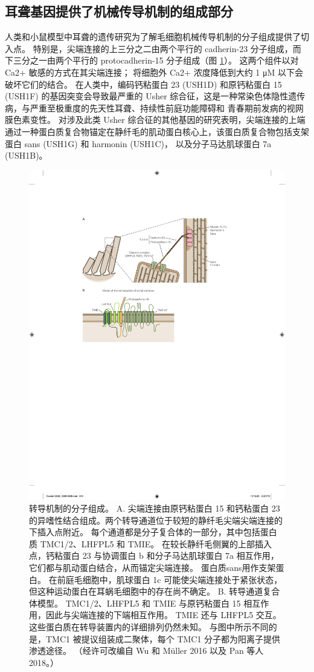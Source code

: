 \subsection{耳聋基因提供了机械传导机制的组成部分}
人类和小鼠模型中耳聋的遗传研究为了解毛细胞机械传导机制的分子组成提供了切入点。 
特别是，尖端连接的上三分之二由两个平行的 cadherin-23 分子组成，而下三分之一由两个平行的 protocadherin-15 分子组成（图 \ref{fig:26_10}）。 
这两个组件以对 Ca2+ 敏感的方式在其尖端连接； 将细胞外 Ca2+ 浓度降低到大约 1 μM 以下会破坏它们的结合。 
在人类中，编码钙粘蛋白 23 (USH1D) 和原钙粘蛋白 15 (USH1F) 的基因突变会导致最严重的 Usher 综合征，这是一种常染色体隐性遗传病，与严重至极重度的先天性耳聋、持续性前庭功能障碍和 青春期前发病的视网膜色素变性。 
对涉及此类 Usher 综合征的其他基因的研究表明，尖端连接的上端通过一种蛋白质复合物锚定在静纤毛的肌动蛋白核心上，该蛋白质复合物包括支架蛋白 sans (USH1G) 和 harmonin (USH1C)， 以及分子马达肌球蛋白 7a (USH1B)。

\begin{figure}[htbp]
	\centering
	\includegraphics[width=0.7\linewidth]{chap26/fig_26_10}
	\caption{转导机制的分子组成。 A. 尖端连接由原钙粘蛋白 15 和钙粘蛋白 23 的异嗜性结合组成。两个转导通道位于较短的静纤毛尖端尖端连接的下插入点附近。 每个通道都是分子复合体的一部分，其中包括蛋白质 TMC1/2、LHFPL5 和 TMIE。 在较长静纤毛侧翼的上部插入点，钙粘蛋白 23 与协调蛋白 b 和分子马达肌球蛋白 7a 相互作用，它们都与肌动蛋白结合，从而锚定尖端连接。 蛋白质sans用作支架蛋白。 在前庭毛细胞中，肌球蛋白 1c 可能使尖端连接处于紧张状态，但这种运动蛋白在耳蜗毛细胞中的存在尚不确定。 B. 转导通道复合体模型。 TMC1/2、LHFPL5 和 TMIE 与原钙粘蛋白 15 相互作用，因此与尖端连接的下端相互作用。 TMIE 还与 LHFPL5 交互。 这些蛋白质在转导装置内的详细排列仍然未知。 与图中所示不同的是，TMC1 被提议组装成二聚体，每个 TMC1 分子都为阳离子提供渗透途径。 （经许可改编自 Wu 和 Müller 2016 以及 Pan 等人 2018。）}
	\label{fig:26_10}
\end{figure}


